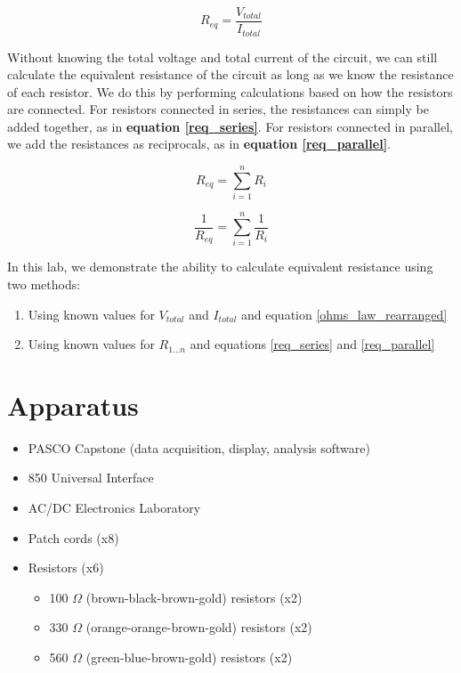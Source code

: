 \documentclass[12pt,letterpaper,titlepage]{report}
\begin{document}
\begin{equation} \label{ohms_law_rearranged}
R_{eq} = \frac{ V_{total} }{ I_{total} }
\end{equation}

Without knowing the total voltage and total current of the circuit, we can still calculate the equivalent resistance of the circuit as long as we know the resistance of each resistor. We do this by performing calculations based on how the resistors are connected. For resistors connected in series, the resistances can simply be added together, as in \textbf{equation \ref{req_series}}. For resistors connected in parallel, we add the resistances as reciprocals, as in \textbf{equation \ref{req_parallel}}.

\begin{equation} \label{req_series}
R_{eq} = \sum_{i=1}^{n} R_{i}
\end{equation}

\begin{equation} \label{req_parallel}
\frac{1}{R_{eq}} = \sum_{i=1}^{n} \frac{1}{R_i}
\end{equation}

\bigskip
In this lab, we demonstrate the ability to calculate equivalent resistance using two methods:

\begin{enumerate}
    \item Using known values for $V_{total}$ and $I_{total}$ and equation \ref{ohms_law_rearranged}
    \item Using known values for $R_{1 \ldots n}$ and equations \ref{req_series} and \ref{req_parallel}
\end{enumerate}



\pagebreak
\section*{Apparatus}

\begin{itemize}
	\item PASCO Capstone (data acquisition, display, analysis software)
	\item 850 Universal Interface
	\item AC/DC Electronics Laboratory
	\item Patch cords (x8)
	\item Resistors (x6)
		\begin{itemize}
			\item 100 $\Omega$ (brown-black-brown-gold) resistors (x2)
			\item 330 $\Omega$ (orange-orange-brown-gold) resistors (x2)
			\item 560 $\Omega$ (green-blue-brown-gold) resistors (x2)
		\end{itemize}
\end{itemize}
\end{document}
